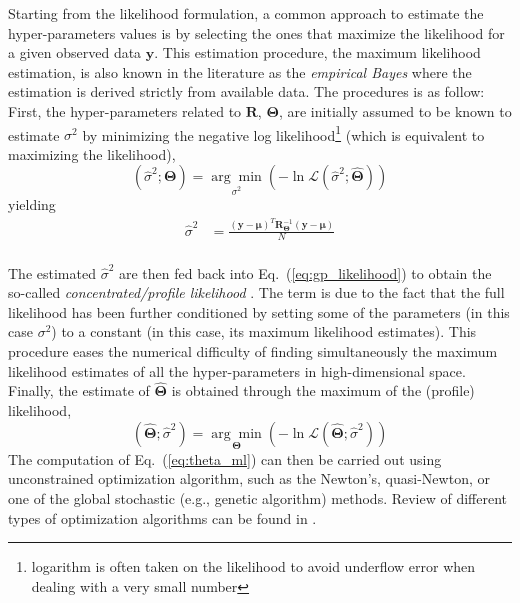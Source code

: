 Starting from the likelihood formulation, a common approach to estimate the hyper-parameters values is by selecting the ones that maximize the likelihood for a given observed data $\mathbf{y}$.
This estimation procedure, the maximum likelihood estimation, is also known in the literature as the \emph{empirical Bayes} \cite{Koehler1996} where the estimation is derived strictly from available data.
The procedures is as follow:
First, the hyper-parameters related to $\mathbf{R}$, $\boldsymbol{\Theta}$, are initially assumed to be known to estimate $\sigma^2$ by minimizing the negative log likelihood\footnote{logarithm is often taken on the likelihood to avoid underflow error when dealing with a very small number} (which is equivalent to maximizing the likelihood),
\begin{equation}
	\left(\hat{\sigma}^2; \boldsymbol{\Theta}\right) = \underset{\sigma^2}{\arg\min} \left(- \ln \mathcal{L} (\hat{\sigma}^2 ; \hat{\boldsymbol{\Theta}})\right)
\label{eq:concentrated_likelihood_1}
\end{equation} 
yielding
\begin{equation}
	\begin{split}
		\hat{\sigma}^2           & = \frac{(\mathbf{y} - \boldsymbol{\mu})^T \mathbf{R}_{\boldsymbol{\Theta}}^{-1} (\mathbf{y} - \boldsymbol{\mu})}{N}\\
	\end{split}
\label{eq:sigma_ml}
\end{equation}

The estimated $\hat{\sigma}^2$ are then fed back into Eq.~(\ref{eq:gp_likelihood}) to obtain the so-called \emph{concentrated/profile likelihood} \cite{Cole2013,Kreutz2013}.
The term is due to the fact that the full likelihood has been further conditioned by setting some of the parameters 
(in this case $\sigma^2$) to a constant (in this case, its maximum likelihood estimates).
This procedure eases the numerical difficulty of finding simultaneously the maximum likelihood estimates of all the hyper-parameters in high-dimensional space.
Finally, the estimate of $\hat{\boldsymbol{\Theta}}$ is obtained through the maximum of the (profile) likelihood,
\begin{equation}
	\left(\hat{\boldsymbol{\Theta}} ; \hat{\sigma}^2\right) = \underset{\boldsymbol{\Theta}}{\arg\min} \left(- \ln \mathcal{L} (\hat{\boldsymbol{\Theta}};\hat{\sigma}^2)\right)
	\label{eq:theta_ml}
\end{equation}
The computation of Eq.~(\ref{eq:theta_ml}) can then be carried out using unconstrained optimization algorithm, 
such as the Newton's, quasi-Newton, or one of the global stochastic (e.g., genetic algorithm) methods.
Review of different types of optimization algorithms can be found in \cite{Venter2010}.

